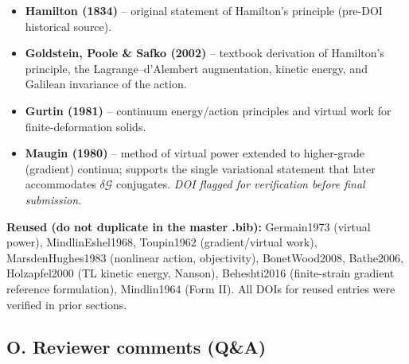\documentclass[11pt]{article}
\begin{document}
\begin{itemize}
\item \textbf{Hamilton (1834)} \cite{Hamilton1834} -- original statement of Hamilton's principle (pre-DOI historical source).

\item \textbf{Goldstein, Poole \& Safko (2002)} \cite{Goldstein2002} -- textbook derivation of Hamilton's principle, the Lagrange--d'Alembert augmentation, kinetic energy, and Galilean invariance of the action.

\item \textbf{Gurtin (1981)} \cite{Gurtin1981} -- continuum energy/action principles and virtual work for finite-deformation solids.

\item \textbf{Maugin (1980)} \cite{Maugin1980} -- method of virtual power extended to higher-grade (gradient) continua; supports the single variational statement that later accommodates $\delta\bm{\mathcal{G}}$ conjugates. \emph{DOI flagged for verification before final submission.}
\end{itemize}

\textbf{Reused (do not duplicate in the master .bib):} Germain1973 (virtual power), MindlinEshel1968, Toupin1962 (gradient/virtual work), MarsdenHughes1983 (nonlinear action, objectivity), BonetWood2008, Bathe2006, Holzapfel2000 (TL kinetic energy, Nanson), Beheshti2016 (finite-strain gradient reference formulation), Mindlin1964 (Form II). All DOIs for reused entries were verified in prior sections.

\subsection{O. Reviewer comments (Q\&A)}
\end{document}
